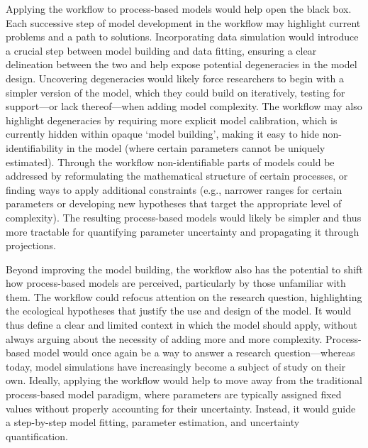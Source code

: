 \documentclass[11pt]{article}
\begin{document}
Applying the workflow to process-based models would help open the black box. %
Each successive step of model development in the workflow may highlight current problems and a path to solutions. Incorporating data simulation would introduce a crucial step between model building and data fitting, ensuring a clear delineation between the two and help expose potential degeneracies in the model design. %
Uncovering degeneracies would likely force researchers to begin with a simpler version of the model, which they could build on iteratively, testing for support---or lack thereof---when adding model complexity. The workflow may also highlight degeneracies by requiring more explicit model calibration, %
which is currently hidden within opaque `model building', making it easy to hide non-identifiability in the model (where certain parameters cannot be uniquely estimated). Through the workflow non-identifiable parts of models could be addressed by reformulating the mathematical structure of certain processes, or finding ways to apply additional constraints (e.g., narrower ranges for certain parameters or developing new hypotheses that target the appropriate level of complexity). The resulting process-based models would likely be simpler and thus more tractable for quantifying parameter uncertainty and propagating it through projections. 

Beyond improving the model building, the workflow also has the potential to shift how process-based models are perceived, particularly by those unfamiliar with them. The workflow could refocus attention on the research question, highlighting the ecological hypotheses that justify the use and design of the model. It would thus define a clear and limited context in which the model should apply, without always arguing about the necessity of adding more and more complexity.  %
Process-based model would once again be a way to answer a research question---whereas today, model simulations have increasingly become a subject of study on their own.
Ideally, applying the workflow would help to move away from the traditional process-based model paradigm, where parameters are typically assigned fixed values without properly accounting for their uncertainty. Instead, it would guide a step-by-step model fitting, parameter estimation, and uncertainty quantification. 
\end{document}
